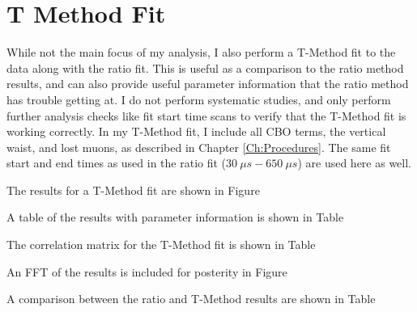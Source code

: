 \graphicspath{ {Figures/TMethod/ResidualsFFT/} }

\chapter{T Method Fit}
\label{Ch:TMethod}


While not the main focus of my analysis, I also perform a T-Method fit to the data along with the ratio fit. This is useful as a comparison to the ratio method results, and can also provide useful parameter information that the ratio method has trouble getting at. I do not perform systematic studies, and only perform further analysis checks like fit start time scans to verify that the T-Method fit is working correctly. In my T-Method fit, I include all CBO terms, the vertical waist, and lost muons, as described in Chapter \ref{Ch:Procedures}. The same fit start and end times as used in the ratio fit ($\SI{30}{\mu s} - \SI{650}{\mu s}$) are used here as well.

The results for a T-Method fit are shown in Figure 

A table of the results with parameter information is shown in Table

The correlation matrix for the T-Method fit is shown in Table

An FFT of the results is included for posterity in Figure



A comparison between the ratio and T-Method results are shown in Table




